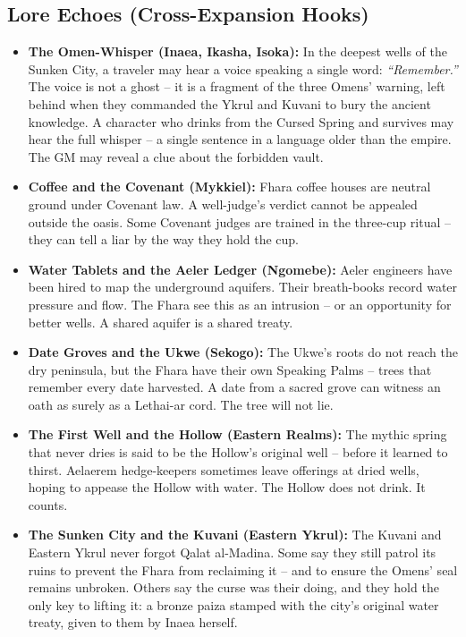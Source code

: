 \subsection*{Lore Echoes (Cross-Expansion Hooks)}
\label{sec:fhara-lore}

\begin{itemize}
  \item \textbf{The Omen-Whisper (Inaea, Ikasha, Isoka):} In the deepest wells of the Sunken City, a traveler may hear a voice speaking a single word: \textit{``Remember.''} The voice is not a ghost -- it is a fragment of the three Omens' warning, left behind when they commanded the Ykrul and Kuvani to bury the ancient knowledge. A character who drinks from the Cursed Spring and survives may hear the full whisper -- a single sentence in a language older than the empire. The GM may reveal a clue about the forbidden vault.
  \item \textbf{Coffee and the Covenant (Mykkiel):} Fhara coffee houses are neutral ground under Covenant law. A well-judge's verdict cannot be appealed outside the oasis. Some Covenant judges are trained in the three-cup ritual -- they can tell a liar by the way they hold the cup.
  \item \textbf{Water Tablets and the Aeler Ledger (Ngomebe):} Aeler engineers have been hired to map the underground aquifers. Their breath-books record water pressure and flow. The Fhara see this as an intrusion -- or an opportunity for better wells. A shared aquifer is a shared treaty.
  \item \textbf{Date Groves and the Ukwe (Sekogo):} The Ukwe's roots do not reach the dry peninsula, but the Fhara have their own Speaking Palms -- trees that remember every date harvested. A date from a sacred grove can witness an oath as surely as a Lethai-ar cord. The tree will not lie.
  \item \textbf{The First Well and the Hollow (Eastern Realms):} The mythic spring that never dries is said to be the Hollow's original well -- before it learned to thirst. Aelaerem hedge-keepers sometimes leave offerings at dried wells, hoping to appease the Hollow with water. The Hollow does not drink. It counts.
  \item \textbf{The Sunken City and the Kuvani (Eastern Ykrul):} The Kuvani and Eastern Ykrul never forgot Qalat al-Madina. Some say they still patrol its ruins to prevent the Fhara from reclaiming it -- and to ensure the Omens' seal remains unbroken. Others say the curse was their doing, and they hold the only key to lifting it: a bronze paiza stamped with the city's original water treaty, given to them by Inaea herself.

\end{itemize}

